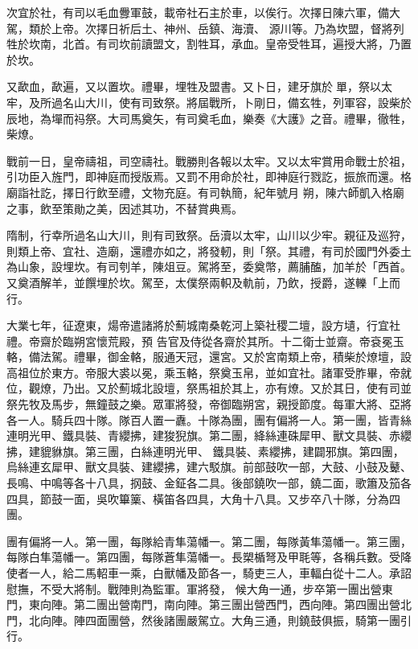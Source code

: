 \begin{pinyinscope}
 次宜於社，有司以毛血釁軍鼓，載帝社石主於車，以俟行。次擇日陳六軍，備大駕，類於上帝。次擇日祈后土、神州、岳鎮、海瀆、
 源川等。乃為坎盟，督將列牲於坎南，北首。有司坎前讀盟文，割牲耳，承血。皇帝受牲耳，遍授大將，乃置於坎。



 又歃血，歃遍，又以置坎。禮畢，埋牲及盟書。又卜日，建牙旗於單，祭以太牢，及所過名山大川，使有司致祭。將屆戰所，卜剛日，備玄牲，列軍容，設柴於辰地，為墠而祃祭。大司馬奠矢，有司奠毛血，樂奏《大護》之音。禮畢，徹牲，柴燎。



 戰前一日，皇帝禱祖，司空禱社。戰勝則各報以太牢。又以太牢賞用命戰士於祖，引功臣入旌門，即神庭而授版焉。又罰不用命於社，即神庭行戮訖，振旅而還。格廟詣社訖，擇日行飲至禮，文物充庭。有司執簡，紀年號月
 朔，陳六師凱入格廟之事，飲至策勛之美，因述其功，不替賞典焉。



 隋制，行幸所過名山大川，則有司致祭。岳瀆以太牢，山川以少牢。親征及巡狩，則類上帝、宜社、造廟，還禮亦如之，將發軔，則「祭。其禮，有司於國門外委土為山象，設埋坎。有司刳羊，陳俎豆。駕將至，委奠幣，薦脯醢，加羊於「西首。又奠酒解羊，並饌埋於坎。駕至，太僕祭兩軹及軌前，乃飲，授爵，遂轢「上而行。



 大業七年，征遼東，煬帝遣諸將於薊城南桑乾河上築社稷二壇，設方壝，行宜社禮。帝齋於臨朔宮懷荒殿，預
 告官及侍從各齋於其所。十二衛士並齋。帝袞冕玉輅，備法駕。禮畢，御金輅，服通天冠，還宮。又於宮南類上帝，積柴於燎壇，設高祖位於東方。帝服大裘以冕，乘玉輅，祭奠玉帛，並如宜社。諸軍受胙畢，帝就位，觀燎，乃出。又於薊城北設壇，祭馬祖於其上，亦有燎。又於其日，使有司並祭先牧及馬步，無鐘鼓之樂。眾軍將發，帝御臨朔宮，親授節度。每軍大將、亞將各一人。騎兵四十隊。隊百人置一纛。十隊為團，團有偏將一人。第一團，皆青絲連明光甲、鐵具裝、青纓拂，建狻猊旗。第二團，絳絲連硃犀甲、獸文具裝、赤纓拂，建貔貅旗。第三團，白絲連明光甲、
 鐵具裝、素纓拂，建闢邪旗。第四團，烏絲連玄犀甲、獸文具裝、建纓拂，建六駁旗。前部鼓吹一部，大鼓、小鼓及鼙、長鳴、中鳴等各十八具，㧏鼓、金鉦各二具。後部鐃吹一部，鐃二面，歌簫及笳各四具，節鼓一面，吳吹篳篥、橫笛各四具，大角十八具。又步卒八十隊，分為四團。



 團有偏將一人。第一團，每隊給青隼蕩幡一。第二團，每隊黃隼蕩幡一。第三團，每隊白隼蕩幡一。第四團，每隊蒼隼蕩幡一。長槊楯弩及甲毦等，各稱兵數。受降使者一人，給二馬軺車一乘，白獸幡及節各一，騎吏三人，車輻白從十二人。承詔慰撫，不受大將制。戰陣則為監軍。軍將發，
 候大角一通，步卒第一團出營東門，東向陣。第二團出營南門，南向陣。第三團出營西門，西向陣。第四團出營北門，北向陣。陣四面團營，然後諸團嚴駕立。大角三通，則鐃鼓俱振，騎第一團引行。




\end{pinyinscope}
